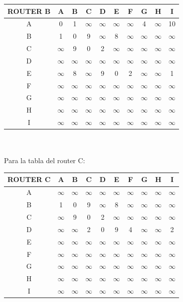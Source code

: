 \documentclass{article}
\begin{document}
\begin{tabular}{ | c | c | c | c | c | c | c | c | c | c |}
\hline                 
ROUTER B    & A      & B      & C      & D      & E      & F      & G      & H      & I      \\
\hline
        A   & 0      & 1      &$\infty$&$\infty$&$\infty$&$\infty$& 4      &$\infty$& 10     \\
\hline
        B   & 1      & 0      & 9      &$\infty$& 8      &$\infty$&$\infty$&$\infty$&$\infty$\\
\hline
        C   &$\infty$& 9      & 0      & 2      &$\infty$&$\infty$&$\infty$&$\infty$&$\infty$\\
\hline
        D   &$\infty$&$\infty$&$\infty$&$\infty$&$\infty$&$\infty$&$\infty$&$\infty$&$\infty$\\
\hline
        E   &$\infty$& 8      &$\infty$& 9      & 0      & 2      &$\infty$&$\infty$& 1      \\
\hline
        F   &$\infty$&$\infty$&$\infty$&$\infty$&$\infty$&$\infty$&$\infty$&$\infty$&$\infty$\\
\hline
        G   &$\infty$&$\infty$&$\infty$&$\infty$&$\infty$&$\infty$&$\infty$&$\infty$&$\infty$\\
\hline
        H   &$\infty$&$\infty$&$\infty$&$\infty$&$\infty$&$\infty$&$\infty$&$\infty$&$\infty$\\
\hline 
        I   &$\infty$&$\infty$&$\infty$&$\infty$&$\infty$&$\infty$&$\infty$&$\infty$&$\infty$\\
\hline
\end{tabular}
\\\\
Para la tabla del router C:\\
\begin{tabular}{ | c | c | c | c | c | c | c | c | c | c |}
\hline                 
ROUTER C    & A      & B      & C      & D      & E      & F      & G      & H      & I      \\
\hline
        A   &$\infty$&$\infty$&$\infty$&$\infty$&$\infty$&$\infty$&$\infty$&$\infty$&$\infty$\\
\hline
        B   & 1      & 0      & 9      &$\infty$& 8      &$\infty$&$\infty$&$\infty$&$\infty$\\
\hline
        C   &$\infty$& 9      & 0      & 2      &$\infty$&$\infty$&$\infty$&$\infty$&$\infty$\\
\hline
        D   &$\infty$&$\infty$& 2      & 0      & 9      & 4      &$\infty$&$\infty$& 2      \\
\hline
        E   &$\infty$&$\infty$&$\infty$&$\infty$&$\infty$&$\infty$&$\infty$&$\infty$&$\infty$\\
\hline
        F   &$\infty$&$\infty$&$\infty$&$\infty$&$\infty$&$\infty$&$\infty$&$\infty$&$\infty$\\
\hline
        G   &$\infty$&$\infty$&$\infty$&$\infty$&$\infty$&$\infty$&$\infty$&$\infty$&$\infty$\\
\hline
        H   &$\infty$&$\infty$&$\infty$&$\infty$&$\infty$&$\infty$&$\infty$&$\infty$&$\infty$\\
\hline 
        I   &$\infty$&$\infty$&$\infty$&$\infty$&$\infty$&$\infty$&$\infty$&$\infty$&$\infty$\\
\hline
\end{tabular}
\end{document}
